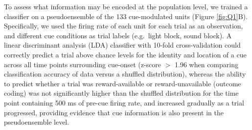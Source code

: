 \documentclass[11pt]{article}
\providecommand{\DIFadd}[1]{{\protect\color{red} \sf #1}} %
\providecommand{\DIFdel}[1]{} %
\providecommand{\DIFaddbegin}{} %
\providecommand{\DIFaddend}{} %
\providecommand{\DIFdelbegin}{} %
\providecommand{\DIFdelend}{} %
\newcommand{\DIFscaledelfig}{0.5}
\newlength{\DIFdelgraphicswidth} %
\newlength{\DIFdelgraphicsheight} %
\newcommand{\DIFaddincludegraphics}[2][]{{\color{red}\fbox{\DIFOincludegraphics[#1]{#2}}}} %
\newcommand{\DIFdelincludegraphics}[2][]{%
\sbox{\DIFdelgraphicsbox}{\DIFOincludegraphics[#1]{#2}}%
\settoboxwidth{\DIFdelgraphicswidth}{\DIFdelgraphicsbox} %
\settoboxtotalheight{\DIFdelgraphicsheight}{\DIFdelgraphicsbox} %
\scalebox{\DIFscaledelfig}{%
\parbox[b]{\DIFdelgraphicswidth}{\usebox{\DIFdelgraphicsbox}\\[-\baselineskip] \rule{\DIFdelgraphicswidth}{0em}}\llap{\resizebox{\DIFdelgraphicswidth}{\DIFdelgraphicsheight}{%
\setlength{\unitlength}{\DIFdelgraphicswidth}%
\begin{picture}(1,1)%
\thicklines\linethickness{2pt} %
{\color[rgb]{1,0,0}\put(0,0){\framebox(1,1){}}}%
{\color[rgb]{1,0,0}\put(0,0){\line( 1,1){1}}}%
{\color[rgb]{1,0,0}\put(0,1){\line(1,-1){1}}}%
\end{picture}%
}\hspace*{3pt}}} %
} %
\DeclareRobustCommand{\DIFaddbegin}{\DIFOaddbegin \let\includegraphics\DIFaddincludegraphics} %
\DeclareRobustCommand{\DIFaddend}{\DIFOaddend \let\includegraphics\DIFOincludegraphics} %
\DeclareRobustCommand{\DIFdelbegin}{\DIFOdelbegin \let\includegraphics\DIFdelincludegraphics} %
\DeclareRobustCommand{\DIFdelend}{\DIFOaddend \let\includegraphics\DIFOincludegraphics} %
\begin{document}
\DIFadd{To assess what information may be encoded }\DIFaddend at the population level, \DIFdelbegin \DIFdel{with a small peak at a time in alignment with entry into the arm, followed by a sustained dip after cue-onset (Figure \ref{fig:pop}B}\DIFdelend \DIFaddbegin \DIFadd{we trained a classifier on a pseudoensemble of the 133 cue-modulated units (Figure \ref{fig:Q1}B). Specifically, we used the firing rate of each unit for each trial as an observation, and different cue conditions as trial labels (e.g.\ light block, sound block). A linear discriminant analysis (LDA) classifier with 10-fold cross-validation could correctly predict a trial above chance levels for the identity and location of a cue across all time points surrounding cue-onset (z-score $>$ 1.96 when comparing classification accuracy of data versus a shuffled distribution), whereas the ability to predict whether a trial was reward-available or reward-unavailable (outcome coding) was not significantly higher than the shuffled distribution for the time point containing 500 ms of pre-cue firing rate}\DIFaddend , \DIFdelbegin \DIFdel{D, F). Units that were modulated by cue identity showed a stronger
increase in response to the preferred task block, as well as a higher tonic
firing rateto the preferred task block, most notably in units that decreased in firing rate to the cue (Figure \ref{fig:pop}A,B).
Units that were modulated by
cue location showed a graded response to locations of decreasing preference, with peak firing occurring around cue-onset (Figure \ref{fig:pop}C, }\DIFdelend \DIFaddbegin \DIFadd{and increased gradually as a trial progressed, providing evidence that cue information is also present in the pseudoensemble level.
}
\end{document}
